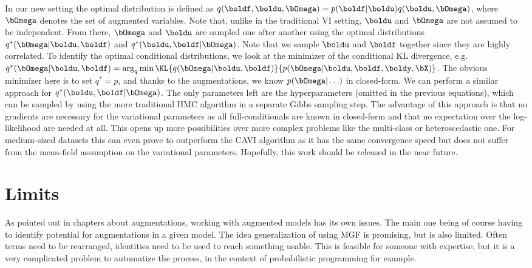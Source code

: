 In our new setting the optimal distribution is defined as $q(\boldf,\boldu,\bOmega) = p(\boldf|\boldu)q(\boldu, \bOmega)$, where $\bOmega$ denotes the set of augmented variables.
Note that, unlike in the traditional \ac{VI} setting, $\boldu$ and $\bOmega$ are not assumed to be independent.
From there, $\bOmega$ and $\boldu$ are sampled one after another using the optimal distributions $q^*(\bOmega|\boldu,\boldf)$ and $q^*(\boldu,\boldf|\bOmega)$.
Note that we sample $\boldu$ and $\boldf$ together since they are highly correlated.
To identify the optimal conditional distributions, we look at the minimizer of the conditional \ac{KL} divergence, e.g. $q^*(\bOmega|\boldu,\boldf) = \arg_{q} \min \KL{q(\bOmega|\boldu,\boldf)}{p(\bOmega|\boldu,\boldf,\boldy,\bX)}$.
The obvious minimizer here is to set $q^*=p$, and thanks to the augmentations, we know $p(\bOmega|\ldots)$ in closed-form.
We can perform a similar approach for $q^*(\boldu,\boldf|\bOmega)$.
The only parameters left are the hyperparameters (omitted in the previous equations), which can be sampled by using the more traditional \ac{HMC} algorithm in a separate Gibbs sampling step.
The advantage of this approach is that no gradients are necessary for the variational parameters as all full-conditionals are known in closed-form and that no expectation over the log-likelihood are needed at all.
This opens up more possibilities over more complex problems like the multi-class or heteroscedastic one.
For medium-sized datasets this can even prove to outperform the \ac{CAVI} algorithm as it has the same convergence speed but does not suffer from the mean-field assumption on the variational parameters.
Hopefully, this work should be released in the near future.

\section{Limits}

As pointed out in chapters about augmentations, working with augmented models has its own issues.
The main one being of course having to identify potential for augmentations in a given model.
The idea generalization of using \ac{MGF} is promising, but is also limited.
Often terms need to be rearranged, identities need to be used to reach something usable.
This is feasible for someone with expertise, but it is a very complicated problem to automatize the process, in the context of probabilistic programming for example.

